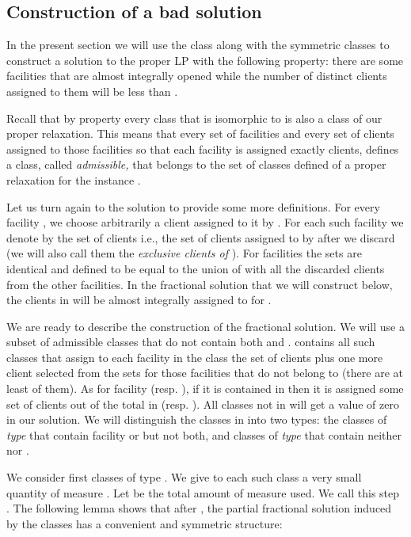 \documentclass[11pt]{article}\usepackage{amsmath}
\begin{document}
\subsection{Construction of a bad  solution}  
\label{subsec:badlbfl}

In the present section we will use the class  along with the
symmetric classes to construct a solution to the proper LP with 
the following
property: there are some   facilities   that
are almost integrally opened while the number of distinct  clients assigned to them will be less than . 

Recall that by property  every class that is isomorphic to  is
also a class of our proper relaxation. This means that
every set  of  facilities and every  set of  clients
assigned to those facilities so that each facility is assigned exactly
 clients, defines a class, called {\em admissible,} that belongs to the set of classes
defined of a  proper relaxation for the instance .

Let  us  turn  again  to  the solution    to  provide  some  more
definitions.  For   every  facility     ,  we  choose
arbitrarily a client  assigned to  it by . For each such facility
  we   denote  by     the  set  of   clients   i.e., the set of clients assigned to
 by  after we discard  (we will also call them the
{\em exclusive clients of }). For facilities   the sets
  are identical  and defined to be equal to 
 the union of  with all
the  discarded clients from  the other  facilities. In  the fractional
solution that we will construct below, the clients in 
will be almost integrally assigned to  for .

We  are   ready  to  describe  the  construction   of  the  fractional
solution. We will use a subset  of admissible classes that 
do not contain both  and  .  contains all such classes   
  that assign to each facility   in the class  the set  of clients   plus  one more
client selected  from the sets   for those facilities
 that do not belong  to  (there are at least 
of them). As for facility  (resp. ), if it  is contained in  then
it is  assigned some set  of  clients  out of the total   in
 (resp. ).  
All classes not in   will get a value
of zero in our solution.
We
will distinguish the classes in  into two types: the classes
of {\em type } that contain facility   or  but not both, and classes
of {\em type } that
 contain neither  nor .

We consider  first classes of type  . We give  to each such class   a
very small  quantity of  measure . Let   be  the total
amount of measure used. We call this step .  The
following  lemma shows  that after  , the  partial fractional
solution  induced  by  the  classes  has a  convenient  and  symmetric
structure:
\end{document}

